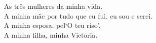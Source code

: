 \begin{flushright}
    As três mulheres da minha vida.\\
    A minha mãe por tudo que eu fui, eu sou e serei.\\
    A minha esposa, pel`O teu riso'.\\
    A minha filha, minha Victoria.\\
\end{flushright}
